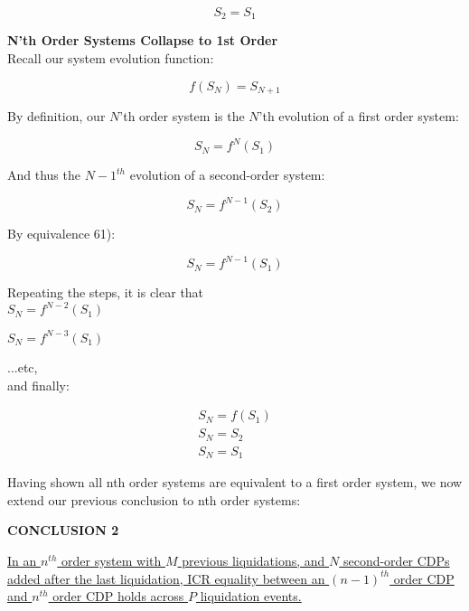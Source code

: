 \documentclass[reqno]{article}
\begin{document}
\begin{equation} 
    S_2=S_1
\end{equation}

\bigskip
\textbf{N’th Order Systems Collapse to 1st Order}\\
Recall our system evolution function: 

\begin{equation} 
    f(S_N)=S_{N+1}
\end{equation}

\bigskip
By definition, our $N$’th order system is the $N$’th evolution of a first order system:

\begin{equation} 
    S_N=f^N(S_1)
\end{equation}

\bigskip
And thus the $N-1^{th}$ evolution of a second-order system:

\begin{equation} 
    S_N=f^{N-1}(S_2)
\end{equation}

\bigskip
By equivalence 61):

\begin{equation} 
    S_N=f^{N-1}(S_1)
\end{equation}

\bigskip
Repeating the steps, it is clear that\\

$S_N=f^{N-2}(S_1)$

$S_N=f^{N-3}(S_1)$

...etc, \\

and finally:

\begin{equation}
    \begin{split}
        S_N=f(S_1)\\
        S_N=S_2\\
        S_N=S_1
    \end{split}
\end{equation}

\bigskip
Having shown all nth order systems are equivalent to a first order system, we now extend our previous conclusion to nth order systems:

\bigskip
\textbf{CONCLUSION 2}

\uline{In an $n^{th}$ order system with $M$ previous liquidations, and $N$ second-order CDPs added after the last liquidation, ICR equality between an $(n-1)^{th}$ order CDP and $n^{th}$ order CDP holds across $P$ liquidation events.}
\end{document}
